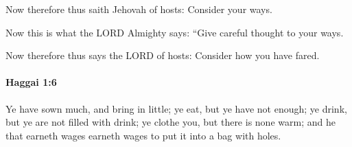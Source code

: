 			\begin{versebox}
					\item[BHS] 
					\item[LXX] 
					\item[ASV] Now therefore thus saith Jehovah of hosts: Consider your ways.
					\item[NIV] Now this is what the LORD Almighty says: “Give careful thought to your ways.
					\item[NRSV] Now therefore thus says the LORD of hosts: Consider how you have fared.
			\end{versebox}

		\paragraph{Haggai 1:6} %
			\label{HAGGAI-1-6}

			Ye have sown much, and bring in little; ye eat, but ye have not enough; ye drink, but ye are not filled with drink; ye clothe you, but there is none warm; and he that earneth wages earneth wages to put it into a bag with holes.

